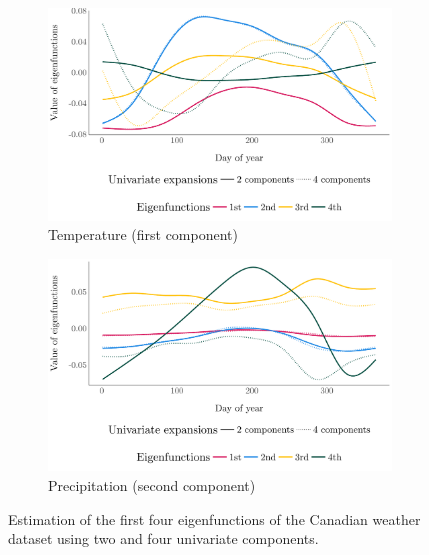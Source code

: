 \documentclass{article}
\newcounter{th}
\begin{document}
\begin{figure}
     \centering
     \begin{subfigure}[b]{0.49\textwidth}
         \centering
         \includegraphics[width=1\textwidth]{figures/temperature_eigen.pdf}
         \caption{Temperature (first component)}
         \label{fig:temperature}
     \end{subfigure}
     \hfill
     \begin{subfigure}[b]{0.49\textwidth}
         \centering
         \includegraphics[width=1\textwidth]{figures/precipitation_eigen.pdf}
         \caption{Precipitation (second component)}
         \label{fig:precipitation}
     \end{subfigure}
     \caption{Estimation of the first four eigenfunctions of the Canadian weather dataset using two and four univariate components.}
     \label{fig:eigenfunctions_weather}
\end{figure}

\end{document}
